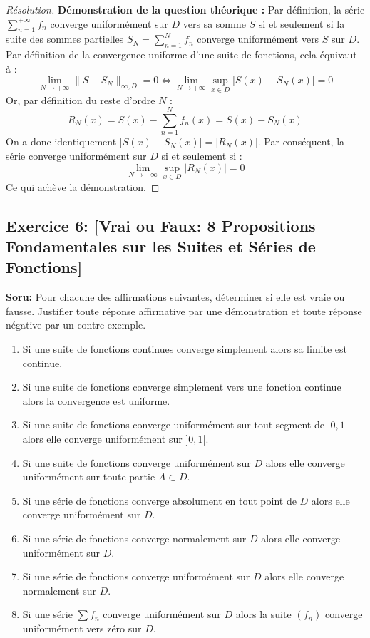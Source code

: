 \documentclass[12pt,a4paper]{report}
\begin{document}
\begin{proof}[Résolution]
\textbf{Démonstration de la question théorique :}
Par définition, la série $\sum_{n=1}^{+\infty} f_n$ converge uniformément sur $D$ vers sa somme $S$ si et seulement si la suite des sommes partielles $S_N = \sum_{n=1}^N f_n$ converge uniformément vers $S$ sur $D$.
Par définition de la convergence uniforme d'une suite de fonctions, cela équivaut à :
\[ \lim_{N \to +\infty} \|S - S_N\|_{\infty, D} = 0 \iff \lim_{N \to +\infty} \sup_{x \in D} |S(x) - S_N(x)| = 0 \]
Or, par définition du reste d'ordre $N$ :
\[ R_N(x) = S(x) - \sum_{n=1}^N f_n(x) = S(x) - S_N(x) \]
On a donc identiquement $|S(x) - S_N(x)| = |R_N(x)|$.
Par conséquent, la série converge uniformément sur $D$ si et seulement si :
\[ \lim_{N \to +\infty} \sup_{x \in D} |R_N(x)| = 0 \]
Ce qui achève la démonstration.
\end{proof}

\subsection*{Exercice 6: [Vrai ou Faux: 8 Propositions Fondamentales sur les Suites et Séries de Fonctions]}

\textbf{Soru:}
Pour chacune des affirmations suivantes, déterminer si elle est vraie ou fausse. Justifier toute réponse affirmative par une démonstration et toute réponse négative par un contre-exemple.
\begin{enumerate}
    \item Si une suite de fonctions continues converge simplement alors sa limite est continue.
    \item Si une suite de fonctions converge simplement vers une fonction continue alors la convergence est uniforme.
    \item Si une suite de fonctions converge uniformément sur tout segment de $]0, 1[$ alors elle converge uniformément sur $]0, 1[$.
    \item Si une suite de fonctions converge uniformément sur $D$ alors elle converge uniformément sur toute partie $A \subset D$.
    \item Si une série de fonctions converge absolument en tout point de $D$ alors elle converge uniformément sur $D$.
    \item Si une série de fonctions converge normalement sur $D$ alors elle converge uniformément sur $D$.
    \item Si une série de fonctions converge uniformément sur $D$ alors elle converge normalement sur $D$.
    \item Si une série $\sum f_n$ converge uniformément sur $D$ alors la suite $(f_n)$ converge uniformément vers zéro sur $D$.
\end{enumerate}
\end{document}
